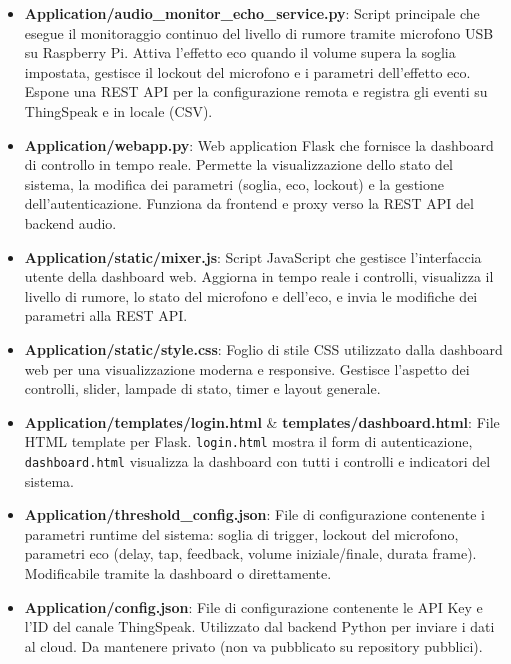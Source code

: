 \documentclass[fleqn,10pt]{SelfArx} %
\begin{document}
\begin{itemize}
	\item \textbf{Application/audio\_monitor\_echo\_service.py}:  
	Script principale che esegue il monitoraggio continuo del livello di rumore tramite microfono USB su Raspberry Pi. Attiva l'effetto eco quando il volume supera la soglia impostata, gestisce il lockout del microfono e i parametri dell'effetto eco. Espone una REST API per la configurazione remota e registra gli eventi su ThingSpeak e in locale (CSV).
	
	\item \textbf{Application/webapp.py}:  
	Web application Flask che fornisce la dashboard di controllo in tempo reale. Permette la visualizzazione dello stato del sistema, la modifica dei parametri (soglia, eco, lockout) e la gestione dell'autenticazione. Funziona da frontend e proxy verso la REST API del backend audio.
	
	\item \textbf{Application/static/mixer.js}:  
	Script JavaScript che gestisce l'interfaccia utente della dashboard web. Aggiorna in tempo reale i controlli, visualizza il livello di rumore, lo stato del microfono e dell'eco, e invia le modifiche dei parametri alla REST API.
	
	\item \textbf{Application/static/style.css}:  
	Foglio di stile CSS utilizzato dalla dashboard web per una visualizzazione moderna e responsive. Gestisce l'aspetto dei controlli, slider, lampade di stato, timer e layout generale.
	
	\item \textbf{Application/templates/login.html} \& \textbf{templates/dashboard.html}:  
	File HTML template per Flask. \texttt{login.html} mostra il form di autenticazione, \texttt{dashboard.html} visualizza la dashboard con tutti i controlli e indicatori del sistema.
	
	\item \textbf{Application/threshold\_config.json}:  
	File di configurazione contenente i parametri runtime del sistema: soglia di trigger, lockout del microfono, parametri eco (delay, tap, feedback, volume iniziale/finale, durata frame). Modificabile tramite la dashboard o direttamente.
	
	\item \textbf{Application/config.json}: %
	File di configurazione contenente le API Key e l'ID del canale ThingSpeak. Utilizzato dal backend Python per inviare i dati al cloud. Da mantenere privato (non va pubblicato su repository pubblici).
	

\end{itemize}
\end{document}

